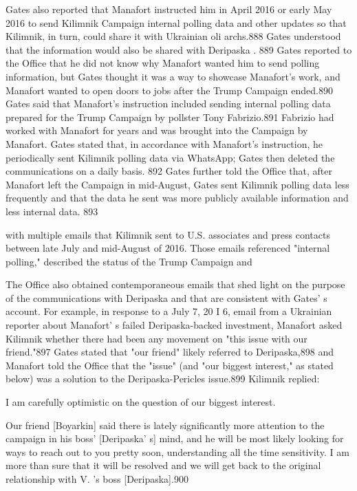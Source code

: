 Gates also reported that Manafort instructed him in April 2016 or early May 2016 to send Kilimnik Campaign internal polling data and other updates so that Kilimnik, in turn, could share it with Ukrainian oli archs.888 Gates understood that the information would also be shared with Deripaska . 889 Gates reported to the Office that he did not know why Manafort wanted him to send polling information, but Gates thought it was a  way to showcase Manafort's work, and Manafort wanted to open doors to jobs after the Trump Campaign ended.890 Gates said that Manafort's instruction included sending internal polling data prepared for the Trump Campaign by pollster Tony Fabrizio.891 Fabrizio had worked with Manafort for years and was brought into the Campaign by Manafort.   Gates stated that,  in accordance with Manafort's instruction, he periodically sent Kilimnik polling data via WhatsApp; Gates then deleted the communications on a daily basis. 892 Gates further told the Office that, after Manafort left the Campaign in mid-August,  Gates sent Kilimnik polling data less frequently and that the data he sent was more publicly available information and less internal data. 893

with multiple emails that Kilimnik sent to U.S. associates and press contacts between late  July and mid-August of 2016. Those emails referenced "internal polling,"  described the status of the Trump Campaign and

The Office also obtained contemporaneous emails that shed light on the purpose of the communications with Deripaska and that are consistent with Gates' s  account. For example,  in response to a  July 7, 20 I 6, email from a Ukrainian reporter about Manafort' s  failed Deripaska-backed investment, Manafort asked Kilimnik whether there had been any movement on "this issue with our friend."897 Gates stated that "our friend" likely referred to Deripaska,898 and Manafort told the Office that the "issue" (and "our biggest interest,"  as stated below) was a  solution to the Deripaska-Pericles issue.899 Kilimnik replied:

I am carefully optimistic on the question of our biggest interest.

Our friend [Boyarkin] said there is lately significantly more attention to the campaign in his boss' [Deripaska' s] mind, and he will be most likely looking for ways to reach out to you pretty soon, understanding all the time sensitivity. I am more than sure that it will be resolved and we will get back to the original relationship with V. 's  boss [Deripaska].900

